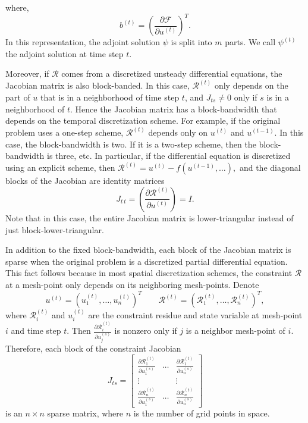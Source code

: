     where,
    \[ b^{(t)} =
        \left( \frac{\partial \mathcal{F}}{\partial u^{(t)}} \right)^T.
    \]
    In this representation, the adjoint solution $\psi$ is split into $m$ parts.
    We call $\psi^{(t)}$ the adjoint solution at time step $t$.
    
    Moreover, if $\mathcal{R}$ comes from a discretized unsteady
    differential equations, the Jacobian matrix is also block-banded.  In
    this case, $\mathcal{R}^{(t)}$ only depends on the part of $u$ that
    is in a neighborhood of time step $t$, and $J_{t s} \ne 0$ only if
    $s$ is in a neighborhood of $t$.  Hence the Jacobian matrix has a
    block-bandwidth that depends on the temporal discretization scheme.
    For example, if the original problem uses a one-step scheme,
    $\mathcal{R}^{(t)}$ depends only on $u^{(t)}$ and $u^{(t-1)}$.  In
    this case, the block-bandwidth is two.  If it is a two-step scheme,
    then the block-bandwidth is three, etc.  In particular, if the
    differential equation is discretized using an explicit scheme, then
    $ \mathcal{R}^{(t)} = u^{(t)} - f(u^{(t-1)},\ldots) ,$
    and the diagonal blocks of the Jacobian are identity matrices
    $$ J_{t\,t} =
        \left( \frac{\partial \mathcal{R}^{(t)}}{\partial u^{(t)}} \right) = I.
    $$
    Note that in this case, the entire Jacobian matrix is
    lower-triangular instead of just block-lower-triangular.
    
    In addition to the fixed block-bandwidth, each block of the Jacobian matrix
    is sparse when the original problem is a discretized partial differential
    equation.   This fact follows because in most spatial discretization
    schemes, the constraint $\mathcal{R}$ at a mesh-point only depends on
    its neighboring mesh-points. Denote
    \[ u^{(t)} = \left( u_1^{(t)}, \ldots, u_n^{(t)} \right)^T  \qquad
        \mathcal{R}^{(t)} = \left( \mathcal{R}_1^{(t)}, \ldots,
        \mathcal{R}_n^{(t)} \right)^T,
    \]
    where $\mathcal{R}_i^{(t)}$ and $u_i^{(t)}$ are the constraint residue and
    state variable at mesh-point $i$ and time step $t$.  Then
    $\frac{\partial \mathcal{R}_i^{(t)}}{\partial u_j^{(s)}}$ is nonzero only
    if $j$ is a neighbor mesh-point of $i$.  Therefore, each block of the
    constraint Jacobian
    \[ J_{t s} =
        \begin{bmatrix}
            \frac{\partial \mathcal{R}_1^{(t)}}{\partial u_1^{(s)}} & \ldots &
                \frac{\partial \mathcal{R}_1^{(t)}}{\partial u_n^{(s)}} \\
            \vdots & & \vdots \\
            \frac{\partial \mathcal{R}_n^{(t)}}{\partial u_1^{(s)}} & \ldots &
                \frac{\partial \mathcal{R}_n^{(t)}}{\partial u_n^{(s)}}
        \end{bmatrix}
    \]
    is an $n \times n$ sparse matrix, where $n$ is the number of grid points
    in space.
    
